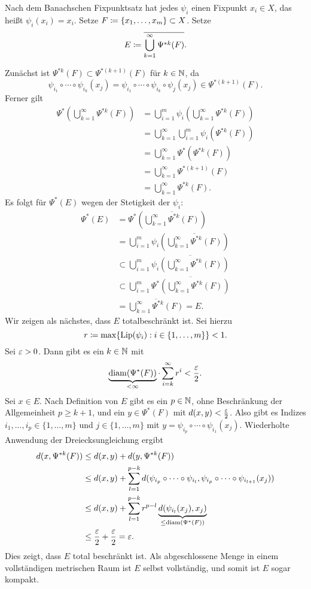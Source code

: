 \documentclass[a4paper,twoside,DIV15,BCOR12mm]{scrbook}
\DeclareMathOperator{\diam}{diam}
\DeclareMathOperator{\Lip}{Lip}
\begin{document}
\begin{beweis}
Nach dem Banachschen Fixpunktsatz hat jedes $\psi_i$ einen Fixpunkt $x_i\in X$, das heißt $\psi_i(x_i) = x_i$. Setze $F \da \{x_1,\ldots,x_m\}\subset X$. Setze 
\[
E\da\overline{\bigcup_{k=1}^\infty \Psi^{*k}(F)}.
\]

Zunächst ist $\Psi^{*k}(F)\subset \Psi^{*(k+1)}(F)$ für $k\in \mathbb{N}$, da 
\[
\psi_{i_1}\circ \cdots \circ \psi_{i_k}(x_j) = \psi_{i_1}\circ \cdots\circ \psi_{i_k}\circ \psi_j (x_j) \in \Psi^{*(k+1)}(F).
\]
Ferner gilt 
\begin{align*}
\Psi^*(\bigcup_{k=1}^\infty \Psi^{*k}(F))
&= \bigcup_{i=1}^m \psi_i(\bigcup_{k=1}^\infty \Psi^{*k}(F))\\
&= \bigcup_{k=1}^\infty \bigcup_{i=1}^m \psi_i(\Psi^{*k}(F))\\
&= \bigcup_{k=1}^\infty \Psi^*(\Psi^{*k}(F))\\
&= \bigcup_{k=1}^\infty \Psi^{*(k+1)}(F) \\
&= \bigcup_{k=1}^\infty \Psi^{*k}(F).
\end{align*}
Es folgt für $\Psi^*(E)$ wegen der Stetigkeit der $\psi_i$:
\begin{align*}
\Psi^*(E)
& =\Psi^*\left(\overline{\bigcup_{k=1}^\infty \Psi^{*k}(F)}\right)\\
&= \bigcup_{i=1}^m\psi_i\left(\overline{\bigcup_{k=1}^\infty \Psi^{*k}(F)}\right) \\
&\subset \bigcup_{i=1}^m\overline{\psi_i\left(\bigcup_{k=1}^\infty \Psi^{*k}(F)\right)} \\
&\subset \bigcup_{i=1}^m\overline{\Psi^*\left(\bigcup_{k=1}^\infty \Psi^{*k}(F)\right)} \\
&= \overline{\bigcup_{k=1}^\infty \Psi^{*k}(F)} = E.
\end{align*}
Wir zeigen als nächstes, dass $E$ totalbeschränkt ist. Sei hierzu
\[
r\da \max\{\Lip(\psi_i): i\in\{1,\ldots,m\}\} < 1.
\]
Sei $\varepsilon>0$. Dann gibt es ein $k\in \mathbb{N}$ mit
\[
\underbrace{\diam(\Psi^*(F))}_{<\infty} \cdot \sum_{i=k}^\infty r^i < \frac\ep2.
\]
Sei $x\in E$. Nach Definition von $E$ gibt es ein $p\in\mathbb{N}$, ohne Beschränkung der Allgemeinheit $p\ge k+1$, und ein $y\in\Psi^*(F)$ mit $d(x,y)<\frac{\varepsilon}2$. Also gibt es Indizes $i_1,\ldots,i_p\in \{1,\ldots,m\}$ und $j\in\{1,\ldots,m\}$ mit $y = \psi_{i_p}\circ\cdots\circ\psi_{i_1}(x_j)$. Wiederholte Anwendung der Dreiecksungleichung ergibt
\begin{align*}
d(x,\Psi^{*k}(F))
&\le d(x,y) + d(y,\Psi^{*k}(F))\\
&\le d(x,y) + \sum _{l=1}^{p-k} d(\psi_{i_p}\circ \cdots \circ \psi_{i_l}, \psi_{i_p} \circ \cdots\circ \psi_{i_{l+1}}(x_j))\\
&\le d(x,y) + \sum_{l=1}^{p-k} r^{p-l} \underbrace{d(\psi_{i_l}(x_j), x_j)}_{\le \diam(\Psi^*(F))}\\
&\le \frac\ep2 + \frac\ep2 = \ep .
\end{align*}
Dies zeigt, dass $E$ total beschränkt ist. Als abgeschlossene Menge in einem vollständigen metrischen Raum 
ist $E$ selbst vollständig, und somit ist $E$ sogar kompakt.


\end{beweis}
\end{document}
